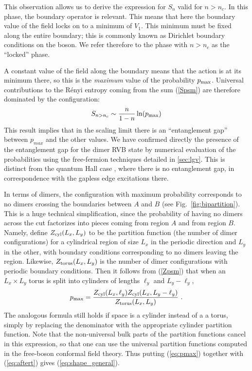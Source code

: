\documentclass[11pt]{iopart}
\begin{document}
This observation allows us to derive the expression for $S_n$ valid for $n>n_c$. In this phase, the boundary operator is relevant. This means that here the boundary value of the field locks on to a minimum of $V_1$. This minimum must be fixed along the entire boundary; this is commonly known as Dirichlet boundary conditions on the boson. We refer therefore to the phase with $n>n_c$ as the ``locked'' phase.

A constant value of the field along the boundary means that the action is at its minimum there, so this is the {\em maximum} value of the probability $p_{\rm max}$. 
Universal contributions to the R\'enyi entropy coming from the sum (\ref{Spsm})  are therefore dominated by the configuration:
\begin{equation}\label{eq:aftert}
 S_{n>n_c}\sim \frac{n}{1-n}\ln (p_{\rm max})
\end{equation}
This result implies that in the scaling limit there is an ``entanglement gap'' between $p_{max}$ and the other values. We have confirmed directly the presence of the entanglement gap for the dimer RVB state by numerical evaluation of the probabilities using the free-fermion techniques detailed in \ref{sec:lgv}.  This is distinct from the quantum Hall case \cite{HaldaneLi}, where there is no entanglement gap, in correspondence with the gapless edge excitations there.
 
 In terms of dimers, the configuration with maximum probability corresponds to no dimers crossing the boundaries between $A$ and $B$ (see Fig.~\ref{fig:bipartition}). This is a huge technical simplification, since the probability of having no dimers across the cut factorizes into pieces coming from region $A$ and from region $B$. Namely, define $Z_{\rm cyl}(L_x, L_y)$ to be the partition function (the number of dimer configurations) for a cylindrical region of size $L_x$ in the periodic direction and $L_y$ in the other, with boundary conditions corresponding to no dimers leaving the region. Likewise, $Z_{\rm torus}(L_x,L_y)$  is the number of dimer configurations with periodic boundary conditions. Then it follows from (\ref{Zpsm}) that when an $L_x\times L_y$ torus is split into cylinders of lengths $\ell_y$ and $L_y-\ell_y$,
\begin{equation}\label{eq:pmax}
 p_{\rm max}=\frac{Z_{\rm cyl}(L_x,\ell_y)Z_{\rm cyl}(L_x,L_y-\ell_y)}{Z_{\rm torus}(L_x,L_y)} \ .
\end{equation}
The analogous formula still holds if space is a cylinder instead of a a torus, simply by replacing the denominator with the appropriate cylinder partition function. Note that the non-universal bulk parts of the partition functions cancel in this expression, so that one can use the universal partition functions computed in the free-boson conformal field theory. Thus putting (\ref{eq:pmax}) together with (\ref{eq:aftert}) gives (\ref{eq:shape_general}). 
\end{document}
